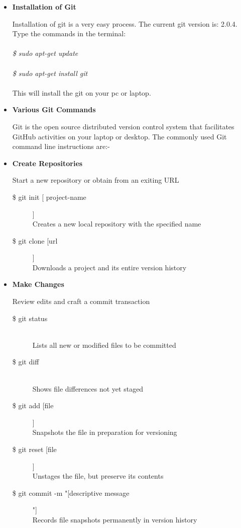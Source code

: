 \begin{itemize}
	\item \textbf{Installation of Git}

Installation of git is a very easy process.
The current git version is: 2.0.4.
Type the commands in the terminal:\\\\
\emph{
	\$ sudo apt-get update\\\\
	\$ sudo apt-get install git\\\\}
This will install the git on your pc or laptop.

\item \textbf{Various Git Commands}

Git is the open source distributed version control system that facilitates GitHub activities on your laptop or desktop. The commonly used Git command line instructions are:-\\

\item \textbf{Create Repositories}
Start a new repository or obtain from an exiting URL

\begin{description}
	
	\item [\$ git init [ project-name]]\\
	Creates a new local repository with the specified name
	\item [\$ git clone [url]]\\
	Downloads a project and its entire version history
	
\end{description}


\item \textbf{Make Changes}
Review edits and craft a commit transaction

\begin{description}
	
	\item [\$ git status] \leavevmode \\
	Lists all new or modified files to be committed
	
	\item [\$ git diff] \leavevmode \\
	Shows file differences not yet staged
	
	\item [\$ git add [file]]\\
	Snapshots the file in preparation for versioning
	
	\item [\$ git reset [file]]\\
	Unstages the file, but preserve its contents
	
	\item [\$ git commit -m "[descriptive message]"]\\
	Records file snapshots permanently in version history
	
\end{description}

\end{itemize}

